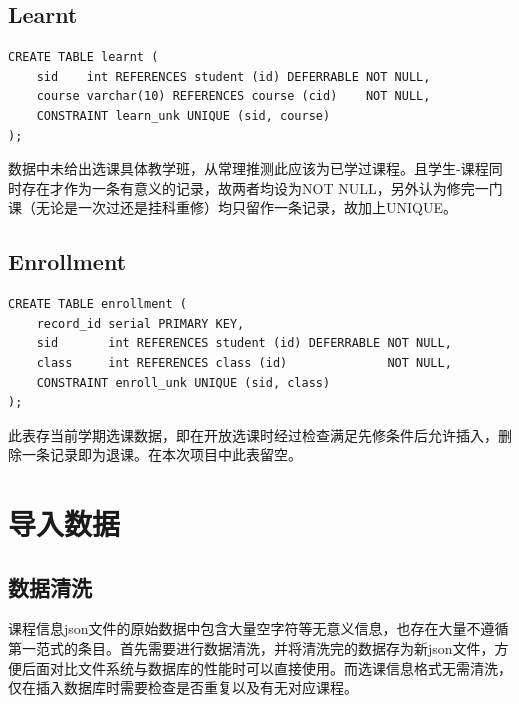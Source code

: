 \subsection{Learnt}
\begin{lstlisting}
CREATE TABLE learnt (
    sid    int REFERENCES student (id) DEFERRABLE NOT NULL,
    course varchar(10) REFERENCES course (cid)    NOT NULL,
    CONSTRAINT learn_unk UNIQUE (sid, course)
);
\end{lstlisting}
\vspace{-3em}\par
数据中未给出选课具体教学班，从常理推测此应该为已学过课程。且学生-课程同时存在才作为一条有意义的记录，故两者均设为NOT NULL，另外认为修完一门课（无论是一次过还是挂科重修）均只留作一条记录，故加上UNIQUE。

\subsection{Enrollment}
\begin{lstlisting}
CREATE TABLE enrollment (
    record_id serial PRIMARY KEY,
    sid       int REFERENCES student (id) DEFERRABLE NOT NULL,
    class     int REFERENCES class (id)              NOT NULL,
    CONSTRAINT enroll_unk UNIQUE (sid, class)
);
\end{lstlisting}
\vspace{-3em}\par
此表存当前学期选课数据，即在开放选课时经过检查满足先修条件后允许插入，删除一条记录即为退课。在本次项目中此表留空。


\section{导入数据}

\subsection{数据清洗}
课程信息json文件的原始数据中包含大量空字符等无意义信息，也存在大量不遵循第一范式的条目。首先需要进行数据清洗，并将清洗完的数据存为新json文件，方便后面对比文件系统与数据库的性能时可以直接使用。而选课信息格式无需清洗，仅在插入数据库时需要检查是否重复以及有无对应课程。

